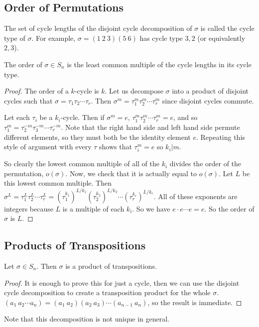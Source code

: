 \subsection{Order of Permutations}
The set of cycle lengths of the disjoint cycle decomposition of $\sigma$ is called the cycle type of $\sigma$. For example, $\sigma = (1\ 2\ 3)(5\ 6)$ has cycle type $3, 2$ (or equivalently $2, 3$).

\begin{theorem}
	The order of $\sigma \in S_n$ is the least common multiple of the cycle lengths in its cycle type.
\end{theorem}
\begin{proof}
	The order of a $k$-cycle is $k$. Let us decompose $\sigma$ into a product of disjoint cycles such that $\sigma = \tau_1 \tau_2 \cdots \tau_r$. Then $\sigma^m = \tau_1^m \tau_2^m \cdots \tau_r^m$ since disjoint cycles commute.

	Let each $\tau_i$ be a $k_i$-cycle. Then if $\sigma^m = e$, $\tau_1^m \tau_2^m \cdots \tau_r^m = e$, and so $\tau_1^m = \tau_2^{-m} \tau_3^{-m} \cdots \tau_r^{-m}$. Note that the right hand side and left hand side permute different elements, so they must both be the identity element $e$. Repeating this style of argument with every $\tau$ shows that $\tau_i^m = e$ so $k_i | m$.

	So clearly the lowest common multiple of all of the $k_i$ divides the order of the permutation, $o(\sigma)$. Now, we check that it is actually equal to $o(\sigma)$. Let $L$ be this lowest common multiple. Then $\sigma^L = \tau_1^L \tau_2^L \cdots \tau_r^L = (\tau_1^{k_1})^{L/k_1} (\tau_2^{k_2})^{L/k_2} \cdots (\tau_r^{k_r})^{L/k_r}$. All of these exponents are integers because $L$ is a multiple of each $k_i$. So we have $e \cdot e \cdots e = e$. So the order of $\sigma$ is $L$.
\end{proof}

\subsection{Products of Transpositions}
\begin{proposition}
	Let $\sigma \in S_n$. Then $\sigma$ is a product of transpositions.
\end{proposition}
\begin{proof}
	It is enough to prove this for just a cycle, then we can use the disjoint cycle decomposition to create a transposition product for the whole $\sigma$. $(a_1\ a_2\cdots a_n) = (a_1\ a_2)(a_2\ a_3)\cdots(a_{n-1}\ a_n)$, so the result is immediate.
\end{proof}
\noindent Note that this decomposition is not unique in general.

